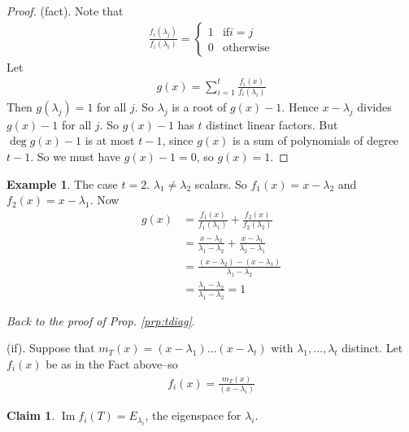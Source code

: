 \documentclass{article}
\theoremstyle{definition} \newtheorem*{definition}{Definition}
\newtheorem*{exmp}{Example} \newtheorem*{exmps}{Examples}
\newtheorem*{claim}{Claim}
\DeclareMathOperator{\Ima}{Im} \DeclareMathOperator{\Sym}{Sym}
\begin{document}
\begin{proof}
  (fact). Note that 
  \begin{align*}
  \frac{f_i(\lambda_j)}{f_i(\lambda_i)}=
  \begin{cases}
    1 & \text{if} i=j\\
    0 & \text{otherwise}
  \end{cases}
  \end{align*}
  Let
  \begin{align*}
    g(x) = \sum_{i=1}^{t}\frac{f_i(x)}{f_i(\lambda_i)}
  \end{align*}
  Then $g(\lambda_j)=1$ for all $j$. So $\lambda_j$ is a root of 
  $g(x)-1$. Hence $x-\lambda_j$ divides $g(x)-1$ for all $j$. So
  $g(x)-1$ has $t$ distinct linear factors. But $\deg g(x)-1$ is 
  at most $t-1$, since $g(x)$ is a sum of polynomials of degree
  $t-1$. So we must have $g(x)-1=0$, so $g(x)=1$.
\end{proof}

\begin{exmp}
  The case $t=2$. $\lambda_1 \neq \lambda_2$ scalars. So
  $f_1(x)=x-\lambda_2$ and $f_2(x)=x-\lambda_1$. Now
  \begin{align*}
    g(x) &= \frac{f_1(x)}{f_1(\lambda_1)} + \frac{f_2(x)}{f_2(\lambda_2)}\\
    &= \frac{x-\lambda_2}{\lambda_1 - \lambda_2} + \frac{x-\lambda_1}{\lambda_2 - \lambda_1}\\
    &= \frac{(x-\lambda_2)-(x-\lambda_1)}{\lambda_1-\lambda_2}\\
    &= \frac{\lambda_1-\lambda_2}{\lambda_1-\lambda_2} = 1
  \end{align*}
\end{exmp}
  \textit{Back to the proof of Prop. \ref{prp:tdiag}}.

  (if). Suppose that $m_T(x)=(x-\lambda_1)\dots(x-\lambda_t)$ with
  $\lambda_1,\dots,\lambda_t$ distinct. Let $f_i(x)$ be as in the Fact
  above--so
  \begin{align*}
    f_i(x)=\frac{m_T(x)}{(x-\lambda_i)}
  \end{align*}
  \begin{claim}
    $\Ima f_i(T)=E_{\lambda_i}$, the eigenspace for $\lambda_i$.
  \end{claim}
\end{document}
